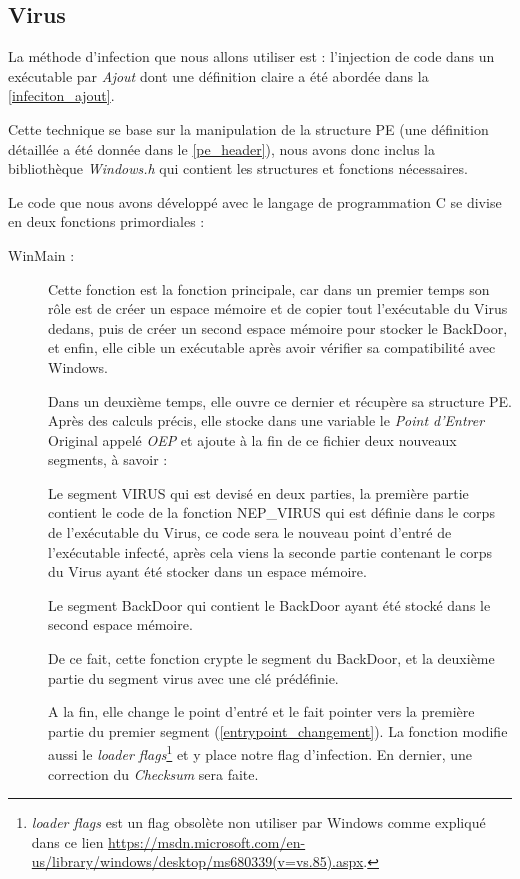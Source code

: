     \subsection{Virus} \label{virus_infecteur}
    La méthode d’infection que nous allons utiliser est : l’injection de code dans un exécutable par \emph{Ajout}
    dont une définition claire a été abordée dans la \autoref{infeciton_ajout}.

    Cette technique se base sur la manipulation de la structure PE (une définition détaillée a été donnée dans le 
    \autoref{pe_header}), nous avons donc inclus la bibliothèque \emph{Windows.h} qui contient les 
    structures et fonctions nécessaires.

    Le code que nous avons développé avec le langage de programmation C se divise en deux fonctions primordiales :
    \begin{description}
        \item[WinMain :] Cette fonction est la fonction principale, car dans un premier temps son rôle est de créer 
        un espace mémoire et de copier tout l'exécutable du Virus dedans, puis de créer un second espace mémoire 
        pour  stocker le BackDoor, et enfin, elle cible un exécutable après avoir vérifier sa compatibilité avec Windows.

        Dans un deuxième temps, elle ouvre ce dernier et récupère sa structure PE. Après des calculs précis, 
        elle stocke dans une variable le \emph{Point d'Entrer} Original appelé \emph{OEP} et ajoute à la fin 
        de ce fichier deux nouveaux segments, à savoir :

        Le segment VIRUS qui est devisé en deux parties, la première partie contient le code de la fonction NEP\_VIRUS 
        qui est définie dans le corps de l'exécutable du Virus, ce code sera le nouveau point d'entré de l'exécutable 
        infecté, après cela viens la seconde partie contenant le corps du Virus ayant été stocker dans un espace mémoire.
       
        Le segment BackDoor qui contient le BackDoor ayant été stocké dans le second espace mémoire.

        De ce fait, cette fonction crypte le segment du BackDoor, et la deuxième partie du segment virus avec une clé prédéfinie.

        A la fin, elle change le point d’entré et le fait pointer vers la première partie du premier segment 
        (\autoref{entrypoint_changement}).
        La fonction modifie aussi le \emph{loader flags}\footnote{\emph{loader flags} est un flag obsolète non
        utiliser par Windows comme expliqué dans ce lien 
        \url{https://msdn.microsoft.com/en-us/library/windows/desktop/ms680339(v=vs.85).aspx}.} et y place notre 
        flag d'infection. En dernier, une correction du \emph{Checksum} sera faite.


\end{description}
